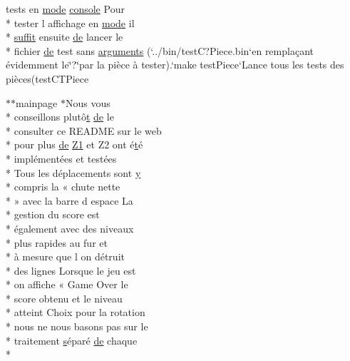 \begin{DoxyCompactItemize}
tests en \hyperlink{glext_8h_a1e71d9c196e4683cc06c4b54d53f7ef5}{mode} \hyperlink{mainpage_8dox_a4aa4ee6520a20be6bee3a5219b5d8d9b}{console} Pour \\*
tester l affichage en \hyperlink{glext_8h_a1e71d9c196e4683cc06c4b54d53f7ef5}{mode} il \\*
\hyperlink{mainpage_8dox_a3cef46abe2a50831a9672fa7c65a1bcb}{suffit} ensuite \hyperlink{mainpage_8dox_ab37fa35e77d95c6d0d0ab620c97c3db8}{de} lancer le \\*
fichier \hyperlink{mainpage_8dox_ab37fa35e77d95c6d0d0ab620c97c3db8}{de} test sans \hyperlink{mainpage_8dox_a75868fe869737bc4cd53fd0c4893b314}{arguments} (`../bin/test\-C?Piece.\-bin`en remplaçant évidemment le\char`\"{}?\char`\"{}par la pièce à tester).`make test\-Piece`Lance tous les tests des pièces(test\-C\-T\-Piece
\item 
$\ast$$\ast$mainpage $\ast$Nous vous \\*
conseillons plutô\hyperlink{gl_8h_a00140d6f5c548b26daf170bf16e86a6d}{t} \hyperlink{mainpage_8dox_ab37fa35e77d95c6d0d0ab620c97c3db8}{de} le \\*
consulter ce R\-E\-A\-D\-M\-E sur le web \\*
pour plus \hyperlink{mainpage_8dox_ab37fa35e77d95c6d0d0ab620c97c3db8}{de} \hyperlink{mainpage_8dox_ac1b4262bdb6c0693bc375775d6cfa421}{Z1} et Z2 ont é\hyperlink{gl_8h_a00140d6f5c548b26daf170bf16e86a6d}{t}é \\*
implémentées et testées \\*
Tous les déplacements sont \hyperlink{gl_8h_a74d80fd479c0f6d0153c709949a089ef}{y} \\*
compris la « chute nette \\*
» avec la barre d espace La \\*
gestion du score est \\*
également avec des niveaux \\*
plus rapides au fur et \\*
à mesure que l on détruit \\*
des lignes Lorsque le jeu est \\*
on affiche « Game Over le \\*
score obtenu et le niveau \\*
atteint Choix pour la rotation \\*
nous ne nous basons pas sur le \\*
traitement \hyperlink{gl_8h_ad585a1393cfa368fa9dc3d8ebff640d5}{s}éparé \hyperlink{mainpage_8dox_ab37fa35e77d95c6d0d0ab620c97c3db8}{de} chaque \\*
$$
\end{DoxyCompactItemize}

